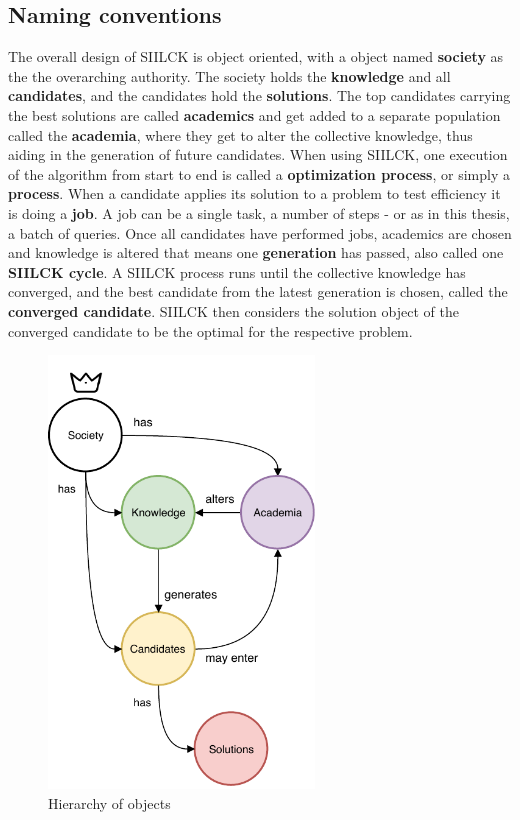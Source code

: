\documentclass[a4paper,english]{report}
\begin{document}
		\subsection{Naming conventions}
		The overall design of SIILCK is object oriented, with a object named  \textbf{society} as the the overarching authority. The society holds the \textbf{knowledge} and all \textbf{candidates}, and the candidates hold the \textbf{solutions}. The top candidates carrying the best solutions are called \textbf{academics} and get added to a separate population called the \textbf{academia}, where they get to alter the collective knowledge, thus aiding in the generation of future candidates. When using SIILCK, one execution of the algorithm from start to end is called a \textbf{optimization process}, or simply a \textbf{process}. When a candidate applies its solution to a problem to test efficiency it is doing a \textbf{job}. A job can be a single task, a number of steps - or as in this thesis, a batch of queries. Once all candidates have performed jobs, academics are chosen and knowledge is altered that means one \textbf{generation} has passed, also called one \textbf{SIILCK cycle}. A SIILCK process runs until the collective knowledge has converged, and the best candidate from the latest generation is chosen, called the \textbf{converged candidate}. SIILCK then considers the solution object of the converged candidate to be the optimal for the respective problem. 
		\begin{figure}[h]
			\centering
			\includegraphics[width=200pt]{OOP}
			\caption{Hierarchy of objects}
		\end{figure}
\end{document}
